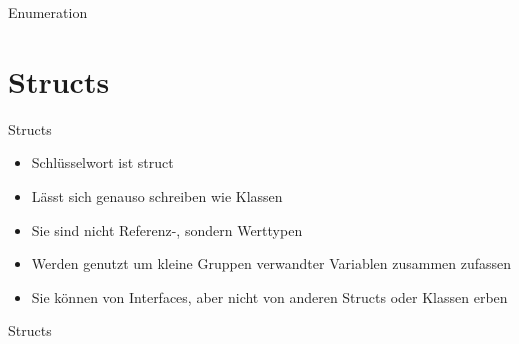 \begin{frame}{Enumeration}
	
	
\end{frame}

\section{Structs}
\begin{frame}{Structs}
	\begin{itemize}
		\item Schlüsselwort ist \alert{struct}
		\item Lässt sich genauso schreiben wie Klassen
		\item Sie sind nicht Referenz-, sondern Werttypen
		\item Werden genutzt um kleine Gruppen verwandter Variablen zusammen zufassen
		\item Sie können von Interfaces, aber nicht von anderen Structs oder Klassen erben 
	\end{itemize}
\end{frame}

\begin{frame}{Structs}
	
	
\end{frame}


